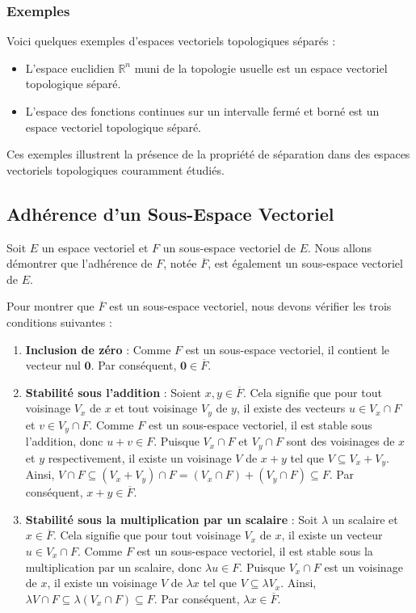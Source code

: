 \documentclass{article}
\theoremstyle{definition}
\theoremstyle{plain}
\begin{document}
\subsubsection{Exemples}

Voici quelques exemples d'espaces vectoriels topologiques séparés :

\begin{itemize}
    \item L'espace euclidien $\mathbb{R}^n$ muni de la topologie usuelle est un espace vectoriel topologique séparé.
    \item L'espace des fonctions continues sur un intervalle fermé et borné est un espace vectoriel topologique séparé.
\end{itemize}

Ces exemples illustrent la présence de la propriété de séparation dans des espaces vectoriels topologiques couramment étudiés.

\subsection{Adhérence d'un Sous-Espace Vectoriel}

Soit $E$ un espace vectoriel et $F$ un sous-espace vectoriel de $E$. Nous allons démontrer que l'adhérence de $F$, notée $\overline{F}$, est également un sous-espace vectoriel de $E$.

Pour montrer que $\overline{F}$ est un sous-espace vectoriel, nous devons vérifier les trois conditions suivantes :

\begin{enumerate}
    \item \textbf{Inclusion de zéro} : Comme $F$ est un sous-espace vectoriel, il contient le vecteur nul $\mathbf{0}$. Par conséquent, $\mathbf{0} \in \overline{F}$.
    \item \textbf{Stabilité sous l'addition} : Soient $x, y \in \overline{F}$. Cela signifie que pour tout voisinage $V_x$ de $x$ et tout voisinage $V_y$ de $y$, il existe des vecteurs $u \in V_x \cap F$ et $v \in V_y \cap F$. Comme $F$ est un sous-espace vectoriel, il est stable sous l'addition, donc $u + v \in F$. Puisque $V_x \cap F$ et $V_y \cap F$ sont des voisinages de $x$ et $y$ respectivement, il existe un voisinage $V$ de $x + y$ tel que $V \subseteq V_x + V_y$. Ainsi, $V \cap F \subseteq (V_x + V_y) \cap F = (V_x \cap F) + (V_y \cap F) \subseteq F$. Par conséquent, $x + y \in \overline{F}$.
    \item \textbf{Stabilité sous la multiplication par un scalaire} : Soit $\lambda$ un scalaire et $x \in \overline{F}$. Cela signifie que pour tout voisinage $V_x$ de $x$, il existe un vecteur $u \in V_x \cap F$. Comme $F$ est un sous-espace vectoriel, il est stable sous la multiplication par un scalaire, donc $\lambda u \in F$. Puisque $V_x \cap F$ est un voisinage de $x$, il existe un voisinage $V$ de $\lambda x$ tel que $V \subseteq \lambda V_x$. Ainsi, $\lambda V \cap F \subseteq \lambda (V_x \cap F) \subseteq F$. Par conséquent, $\lambda x \in \overline{F}$.
\end{enumerate}
\end{document}
